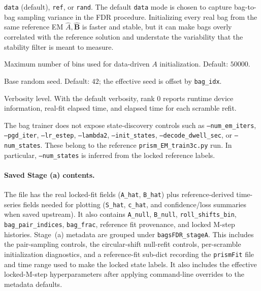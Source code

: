 \documentclass[11pt]{article}
\begin{document}
\begin{description}
  \texttt{data} (default), \texttt{ref}, or \texttt{rand}.
  The default \texttt{data} mode is chosen to capture bag-to-bag sampling
  variance in the FDR procedure. Initializing every real bag from the same
  reference EM \(\hat A,\hat{\mathbf B}\) is faster and stable, but it can
  make bags overly correlated with the reference solution and understate the
  variability that the stability filter is meant to measure.
  \item[\texttt{--init\_A\_Tmax}] Maximum number of bins used for
  data-driven \(A\) initialization. Default: \(50000\).
  \item[\texttt{--seed}] Base random seed. Default: \(42\); the effective
  seed is offset by \texttt{bag\_idx}.
  \item[\texttt{--verb}] Verbosity level. With the default verbosity, rank
  \(0\) reports runtime device information, real-fit elapsed time, and
  elapsed time for each scramble refit.
\end{description}

The bag trainer does not expose state-discovery controls such as
\texttt{--num\_em\_iters}, \texttt{--pgd\_iter}, \texttt{--lr\_estep},
\texttt{--lambda2}, \texttt{--init\_states}, \texttt{--decode\_dwell\_sec},
or \texttt{--num\_states}. These belong to the reference
\texttt{prism\_EM\_train3c.py} run. In particular, \texttt{--num\_states}
is inferred from the locked reference labels.

\paragraph{Saved Stage (a) contents.}
The file has the real locked-fit fields (\texttt{A\_hat}, \texttt{B\_hat})
plus reference-derived time-series fields needed for plotting
(\texttt{S\_hat}, \texttt{c\_hat}, and confidence/loss summaries when saved
upstream). It also contains \texttt{A\_null}, \texttt{B\_null},
\texttt{roll\_shifts\_bin}, \texttt{bag\_pair\_indices},
\texttt{bag\_frac}, reference fit provenance, and locked M-step histories.
Stage~(a) metadata are grouped under \texttt{bagsFDR\_stageA}. This includes
the pair-sampling controls, the circular-shift null-refit controls,
per-scramble initialization diagnostics, and a reference-fit sub-dict
recording the \texttt{prismFit} file and time range used to make the locked
state labels. It also includes the effective locked-M-step hyperparameters
after applying command-line overrides to the metadata defaults.
\end{document}
